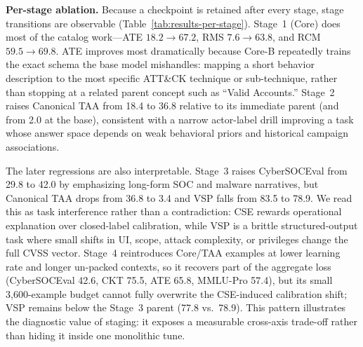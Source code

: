 \documentclass[conference]{IEEEtran}
\begin{document}
\textbf{Per-stage ablation.} Because a checkpoint is retained after every stage, stage transitions are observable (Table~\ref{tab:results-per-stage}). Stage~1 (Core) does most of the catalog work---ATE $18.2\to67.2$, RMS $7.6\to63.8$, and RCM $59.5\to69.8$. ATE improves most dramatically because Core-B repeatedly trains the exact schema the base model mishandles: mapping a short behavior description to the most specific ATT\&CK technique or sub-technique, rather than stopping at a related parent concept such as ``Valid Accounts.'' Stage~2 raises Canonical TAA from 18.4 to 36.8 relative to its immediate parent (and from 2.0 at the base), consistent with a narrow actor-label drill improving a task whose answer space depends on weak behavioral priors and historical campaign associations.

The later regressions are also interpretable. Stage~3 raises CyberSOCEval from 29.8 to 42.0 by emphasizing long-form SOC and malware narratives, but Canonical TAA drops from 36.8 to 3.4 and VSP falls from 83.5 to 78.9. We read this as task interference rather than a contradiction: CSE rewards operational explanation over closed-label calibration, while VSP is a brittle structured-output task where small shifts in UI, scope, attack complexity, or privileges change the full CVSS vector. Stage~4 reintroduces Core/TAA examples at lower learning rate and longer un-packed contexts, so it recovers part of the aggregate loss (CyberSOCEval 42.6, CKT 75.5, ATE 65.8, MMLU-Pro 57.4), but its small 3,600-example budget cannot fully overwrite the CSE-induced calibration shift; VSP remains below the Stage~3 parent (77.8 vs.\ 78.9). This pattern illustrates the diagnostic value of staging: it exposes a measurable cross-axis trade-off rather than hiding it inside one monolithic tune.
\end{document}
